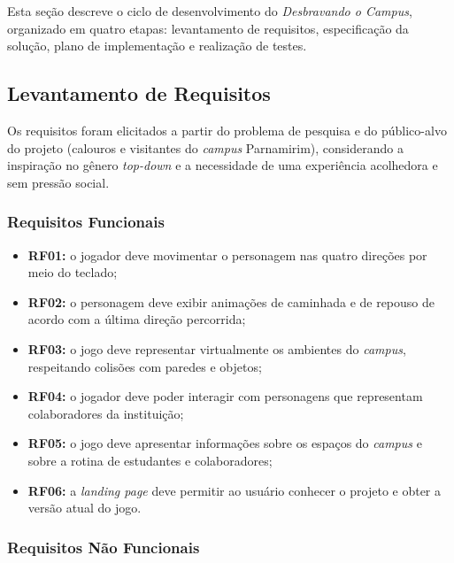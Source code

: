 \documentclass[12pt, a4paper]{article}
\begin{document}
Esta seção descreve o ciclo de desenvolvimento do \textit{Desbravando o Campus},
organizado em quatro etapas: levantamento de requisitos, especificação da solução,
plano de implementação e realização de testes.

\subsection{Levantamento de Requisitos}

Os requisitos foram elicitados a partir do problema de pesquisa e do público-alvo
do projeto (calouros e visitantes do \textit{campus} Parnamirim), considerando
a inspiração no gênero \textit{top-down} e a necessidade de uma experiência
acolhedora e sem pressão social.

\subsubsection{Requisitos Funcionais}

\begin{itemize}
    \item \textbf{RF01:} o jogador deve movimentar o personagem nas quatro direções
    por meio do teclado;

    \item \textbf{RF02:} o personagem deve exibir animações de caminhada e de
    repouso de acordo com a última direção percorrida;

    \item \textbf{RF03:} o jogo deve representar virtualmente os ambientes do
    \textit{campus}, respeitando colisões com paredes e objetos;

    \item \textbf{RF04:} o jogador deve poder interagir com personagens que
    representam colaboradores da instituição;

    \item \textbf{RF05:} o jogo deve apresentar informações sobre os espaços do
    \textit{campus} e sobre a rotina de estudantes e colaboradores;

    \item \textbf{RF06:} a \textit{landing page} deve permitir ao usuário conhecer
    o projeto e obter a versão atual do jogo.
\end{itemize}

\subsubsection{Requisitos Não Funcionais}
\end{document}
